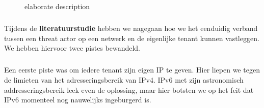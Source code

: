 
\chapter{}%
\label{ch:methodologie}


\begin{figure}[!htbp]
    
    \caption[Requirements and Capability]{elaborate description}
    \label{fig:RequirementsCapability}
\end{figure}

\paragraph{}
Tijdens de \textbf{literatuurstudie} hebben we nagegaan hoe we het eenduidig verband tussen een threat actor op een netwerk en de eigenlijke tenant kunnen vastleggen. We hebben hiervoor twee pistes bewandeld.

\paragraph{}
Een eerste piste was om iedere tenant zijn eigen IP te geven. Hier liepen we tegen de limieten van het adresseringsbereik van IPv4. IPv6 met zijn astronomisch addresseringsbereik leek even de oplossing, maar hier botsten we op het feit dat IPv6 momenteel nog nauwelijks ingeburgerd is.

